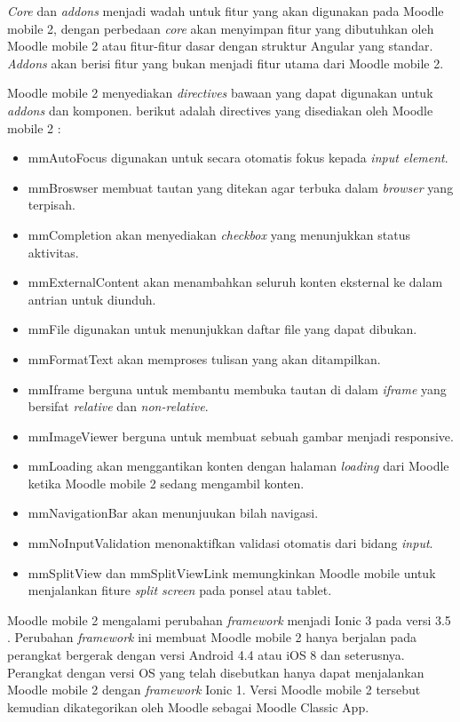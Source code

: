 \textit{Core} dan \textit{addons} menjadi wadah untuk fitur yang akan digunakan pada Moodle mobile 2, dengan perbedaan \textit{core} akan menyimpan fitur yang dibutuhkan oleh Moodle mobile 2 atau fitur-fitur dasar dengan struktur Angular yang standar. \textit{Addons} akan berisi fitur yang bukan menjadi fitur utama dari Moodle mobile 2. \cite{Moodlemobile2:overview}

Moodle mobile 2 menyediakan \textit{directives} bawaan yang dapat digunakan untuk \textit{addons} dan komponen. berikut adalah directives yang disediakan oleh Moodle mobile 2 : \cite{Moodlemobile2:overview}
\begin{itemize}
\item mmAutoFocus digunakan untuk secara otomatis fokus kepada \textit{input element}.
\item mmBroswser membuat tautan yang ditekan agar terbuka dalam \textit{browser} yang terpisah.
\item mmCompletion akan menyediakan \textit{checkbox} yang menunjukkan status aktivitas.
\item mmExternalContent akan menambahkan seluruh konten eksternal ke dalam antrian untuk diunduh.
\item mmFile digunakan untuk menunjukkan daftar file yang dapat dibukan.
\item mmFormatText akan memproses tulisan yang akan ditampilkan.
\item mmIframe berguna untuk membantu membuka tautan di dalam \textit{iframe} yang bersifat \textit{relative} dan \textit{non-relative}.
\item mmImageViewer berguna untuk membuat sebuah gambar menjadi responsive.
\item mmLoading akan menggantikan konten dengan halaman \textit{loading} dari Moodle ketika Moodle mobile 2 sedang mengambil konten.
\item mmNavigationBar akan menunjuukan bilah navigasi.
\item mmNoInputValidation menonaktifkan validasi otomatis dari bidang \textit{input}.
\item mmSplitView dan mmSplitViewLink memungkinkan Moodle mobile untuk menjalankan fiture \textit{split screen} pada ponsel atau tablet.
\end{itemize}

Moodle mobile 2 mengalami perubahan \textit{framework} menjadi Ionic 3 pada versi 3.5 \cite{Moodlemobile2:version:3.5}. Perubahan \textit{framework} ini membuat Moodle mobile 2 hanya berjalan pada perangkat bergerak dengan versi Android 4.4 atau iOS 8 dan seterusnya. Perangkat dengan versi OS yang telah disebutkan hanya dapat menjalankan Moodle mobile 2 dengan \textit{framework} Ionic 1. Versi Moodle mobile 2 tersebut kemudian dikategorikan oleh Moodle sebagai Moodle Classic App.

